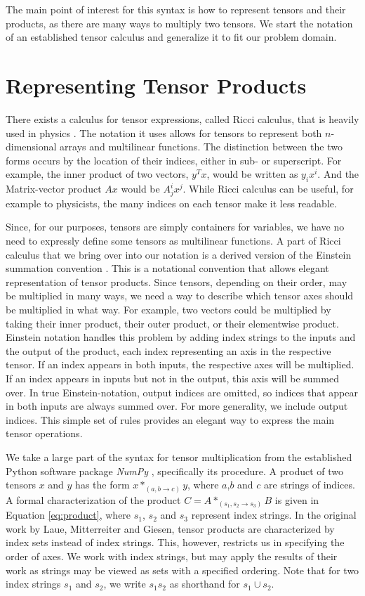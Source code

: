 \documentclass[12pt, a4paper]{report} %
\begin{document}
The main point of interest for this syntax is how to represent tensors and their products, as there are many ways to multiply two tensors.
We start the notation of an established tensor calculus and generalize it to fit our problem domain.

\section{Representing Tensor Products}
There exists a calculus for tensor expressions, called Ricci calculus, that is heavily used in physics \cite{ricci}. 
The notation it uses allows for tensors to represent both $n$-dimensional arrays and multilinear functions.
The distinction between the two forms occurs by the location of their indices, either in sub- or superscript.
For example, the inner product of two vectors, $y^Tx$, would be written as $y_ix^i$. And the Matrix-vector product $Ax$ would be $A^i_jx^j$.
While Ricci calculus can be useful, for example to physicists, the many indices on each tensor make it less readable.

Since, for our purposes, tensors are simply containers for variables, we have no need to expressly define some tensors as multilinear functions.
A part of Ricci calculus that we bring over into our notation is a derived version of the Einstein summation convention \cite{einstein}.
This is a notational convention that allows elegant representation of tensor products.
Since tensors, depending on their order, may be multiplied in many ways, we need a way to describe which tensor axes should be multiplied in what way.
For example, two vectors could be multiplied by taking their inner product, their outer product, or their elementwise product.
Einstein notation handles this problem by adding index strings to the inputs and the output of the product, each index representing an axis in the respective tensor.
If an index appears in both inputs, the respective axes will be multiplied.
If an index appears in inputs but not in the output, this axis will be summed over.
In true Einstein-notation, output indices are omitted, so indices that appear in both inputs are always summed over. 
For more generality, we include output indices.
This simple set of rules provides an elegant way to express the main tensor operations.

We take a large part of the syntax for tensor multiplication from the established Python software package \textit{NumPy} \cite{numpy}, specifically its  procedure.
A product of two tensors $x$ and $y$ has the form $x*_{(a,b \rightarrow c)}y$, where $a$,$b$ and $c$ are strings of indices.
A formal characterization of the product $C = A *_{(s_1,s_2 \rightarrow s_3)} B$ is given in Equation \ref{eq:product}, where $s_1$, $s_2$ and $s_3$ represent index strings.
In the original work \cite{tensorpaper} by Laue, Mitterreiter and Giesen, tensor products are characterized by index sets instead of index strings.
This, however, restricts us in specifying the order of axes.
We work with index strings, but may apply the results of their work as strings may be viewed as sets with a specified ordering.
Note that for two index strings $s_1$ and $s_2$, we write $s_1 s_2$ as shorthand for $s_1 \cup s_2$.
\end{document}
